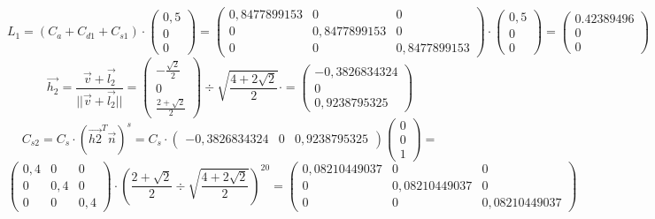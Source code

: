\documentclass{article}
\begin{document}
\[
L_1=(
C_a+C_{d1}+C_{s1})\cdot
\begin{pmatrix}
0,5\\0\\0
\end{pmatrix}=
\begin{pmatrix}
0,8477899153 & 0 & 0\\
0 & 0,8477899153 & 0\\
0 & 0 & 0,8477899153
\end{pmatrix}\cdot
\begin{pmatrix}
0,5\\0\\0
\end{pmatrix}=
\begin{pmatrix}
0.42389496\\0\\0
\end{pmatrix}
\]
\[
\overrightarrow{h_2}=\frac{\overrightarrow{v}+\overrightarrow{l_2}}{||\overrightarrow{v}+\overrightarrow{l_2}||}=
\begin{pmatrix}
-\frac{\sqrt{2}}{2}\\0\\ \frac{2+\sqrt{2}}{2}
\end{pmatrix} \div \sqrt{\frac{4+2\sqrt2}{2}}\cdot=
\begin{pmatrix}
-0,3826834324\\ 0\\0,9238795325
\end{pmatrix}
\]\[
C_{s2}=C_s\cdot(\overrightarrow{h2}^T\overrightarrow{n})^s= C_s\cdot
\begin{pmatrix}
-0,3826834324 & 0 &0,9238795325
\end{pmatrix}
\begin{pmatrix}
0\\ 0\\ 1
\end{pmatrix}=
\]
\[
\begin{pmatrix}
0,4 & 0 & 0\\
0 & 0,4 & 0\\
0 & 0 & 0,4
\end{pmatrix}\cdot (\frac{2+\sqrt{2}}{2} \div \sqrt{\frac{4+2\sqrt2}{2}})^{20}=
\begin{pmatrix}
0,08210449037 & 0 & 0\\
0 & 0,08210449037 & 0\\
0 & 0 & 0,08210449037
\end{pmatrix}\]
\end{document}
